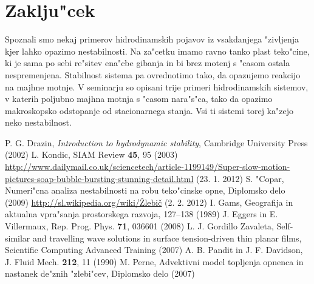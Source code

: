 \documentclass[a4paper,10pt]{article}
\begin{document}
\section{Zaklju"cek}

Spoznali smo nekaj primerov hidrodinamskih pojavov iz vsakdanjega "zivljenja kjer lahko opazimo nestabilnosti. Na za"cetku imamo ravno tanko plast teko"cine, ki je sama po sebi re"sitev ena"cbe gibanja in bi brez motenj s "casom ostala nespremenjena. Stabilnost sistema pa ovrednotimo tako, da opazujemo reakcijo na majhne motnje. V seminarju so opisani trije primeri hidrodinamskih sistemov, v katerih poljubno majhna motnja s "casom nara"s"ca, tako da opazimo makroskopsko odstopanje od stacionarnega stanja. Vsi ti sistemi torej ka"zejo neko nestabilnost. 

\begin{thebibliography}{3}
   P. G. Drazin, \textit{Introduction to hydrodynamic stability}, Cambridge University Press (2002)
   L. Kondic, SIAM Review \textbf{45}, 95 (2003)
   \url{http://www.dailymail.co.uk/sciencetech/article-1199149/Super-slow-motion-pictures-soap-bubble-bursting-stunning-detail.html} (23. 1. 2012)
   S. "Copar, Numeri"cna analiza nestabilnosti na robu teko"cinske opne, Diplomsko delo (2009)
   \href{http://sl.wikipedia.org/wiki/\%C5\%BDlebi\%C4\%8Di}{http://sl.wikipedia.org/wiki/\v Zlebič} (2. 2. 2012)
   I. Gams, Geografija in aktualna vpra"sanja prostorskega razvoja, 127--138 (1989)
   J. Eggers in E. Villermaux, Rep. Prog. Phys. \textbf{71}, 036601 (2008)
   L. J. Gordillo Zavaleta, Self-similar and travelling wave solutions in surface tension-driven thin planar films, Scientific Computing Advanced Training (2007)
   A. B. Pandit in J. F. Davidson, J. Fluid Mech. \textbf{212}, 11 (1990)
   M. Perne, Advektivni model topljenja opnenca in nastanek de"znih "zlebi"cev, Diplomsko delo (2007)
\end{thebibliography}
\end{document}
